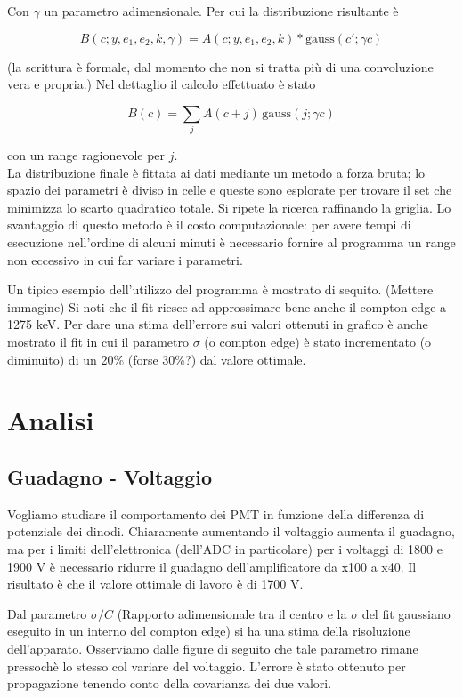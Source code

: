 \documentclass[a4paper,11pt,italian]{report}
\begin{document}
Con $\gamma$ un parametro adimensionale. Per cui la distribuzione risultante è

\[ B(c; y, e_1, e_2, k ,\gamma) = A(c;y,e_1,e_2,k) * \text{gauss}(c';\gamma c) \]

(la scrittura è formale, dal momento che non si tratta più di una convoluzione vera e propria.) Nel dettaglio il calcolo effettuato è stato

\[ B(c) = \sum_j A(c+j)\,  \text{gauss}(j;\gamma c) \]

con un range ragionevole per $j$.\\

La distribuzione finale è fittata ai dati mediante un metodo a forza bruta; lo spazio dei parametri è diviso in celle e queste sono esplorate per trovare il set che minimizza lo scarto quadratico totale. Si ripete la ricerca raffinando la griglia. Lo svantaggio di questo metodo è il costo computazionale: per avere tempi di esecuzione nell'ordine di alcuni minuti è necessario fornire al programma un range non eccessivo in cui far variare i parametri. 

Un tipico esempio dell'utilizzo del programma è mostrato di sequito.
(Mettere immagine)
Si noti che il fit riesce ad approssimare bene anche il compton edge a 1275 keV. Per dare una stima dell'errore sui valori ottenuti in grafico è anche mostrato il fit in cui il parametro $\sigma$ (o compton edge) è stato incrementato (o diminuito) di un 20\% (forse 30\%?) dal valore ottimale.
\section{Analisi}

\subsection*{Guadagno - Voltaggio}

Vogliamo studiare il comportamento dei PMT in funzione della differenza di potenziale dei dinodi. Chiaramente aumentando il voltaggio aumenta il guadagno, ma per i limiti dell'elettronica (dell'ADC in particolare) per i voltaggi di 1800 e 1900 V è necessario ridurre il guadagno dell'amplificatore da x100 a x40. Il risultato è che il valore ottimale di lavoro è di 1700 V. 

Dal parametro $\sigma/C$ (Rapporto adimensionale tra il centro e la $\sigma$ del fit gaussiano eseguito in un interno del compton edge) si ha una stima della risoluzione dell'apparato. Osserviamo dalle figure di seguito che tale parametro rimane pressochè lo stesso col variare del voltaggio.
L'errore è stato ottenuto per propagazione tenendo conto della covarianza dei due valori.
\end{document}
